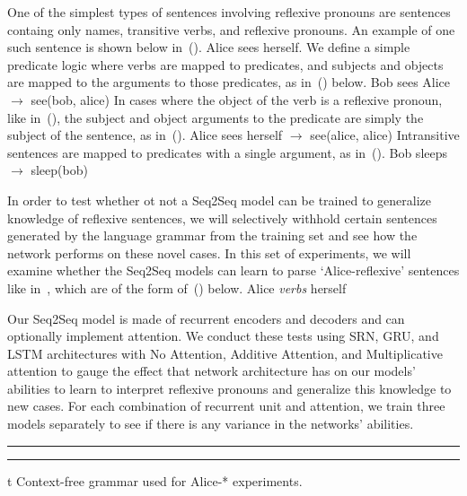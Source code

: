 One of the simplest types of sentences involving reflexive pronouns are 
sentences containg only names, transitive verbs, and reflexive pronouns. An
example of one such sentence is shown below in~(\nextx).
	Alice sees herself.
\xe
We define a simple predicate logic where verbs are mapped to predicates, and
subjects and objects are mapped to the arguments to those predicates, as 
in~(\nextx) below.
\ex
	Bob sees Alice $\to$ see(bob, alice)
\xe
In cases where the object of the verb is a reflexive pronoun, like in~(\blastx), the subject and
object arguments to the predicate are simply the subject of the sentence, as
in~(\nextx).
\ex
	Alice sees herself $\to$ see(alice, alice)
\xe
Intransitive sentences are mapped to predicates with a single argument, as 
in~(\nextx).
\ex
	Bob sleeps $\to$ sleep(bob)
\xe

In order to test whether ot not a Seq2Seq model can be trained to generalize 
knowledge of reflexive sentences, we will selectively withhold certain 
sentences generated by the language grammar from the training set and see how
the network performs on these novel cases. In this set of experiments, we will
examine whether the Seq2Seq models can learn to parse `Alice-reflexive' 
sentences like in~, which are of the form of~(\nextx) below.
\ex
	Alice {\it verbs} herself
\xe

Our Seq2Seq model is made of recurrent encoders and decoders and can 
optionally implement attention. We conduct these tests using SRN, GRU, and LSTM
architectures with No Attention, Additive Attention, and Multiplicative 
attention to gauge the effect that network architecture has on our models' 
abilities to learn to interpret reflexive pronouns and generalize this 
knowledge to new cases. For each combination of recurrent unit and attention,
we train three models separately to see if there is any variance in the 
networks' abilities.

\par\nobreak\medskip
\hrule width 5.5in
\smallskip
{}
\smallskip
\hrule width 5.5in
\par\nobreak\medskip
\caption/t Context-free grammar used for Alice-* experiments.

